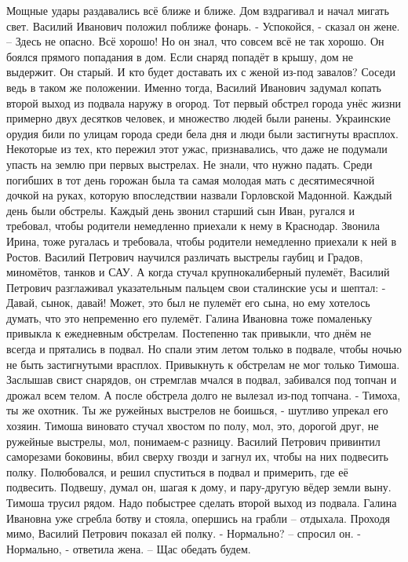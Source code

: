 Мощные удары раздавались всё ближе и ближе. Дом вздрагивал и начал мигать свет. Василий Иванович положил поближе фонарь.
- Успокойся, - сказал он жене. – Здесь не опасно.  Всё хорошо!
Но он знал, что совсем всё не так хорошо. Он боялся прямого попадания в дом. Если снаряд попадёт в крышу, дом не выдержит. Он старый. И кто будет доставать их с женой из-под завалов? Соседи ведь в таком же положении. Именно тогда, Василий Иванович задумал копать второй выход из подвала наружу в огород.
Тот первый обстрел города унёс жизни примерно двух десятков человек, и множество людей были ранены. Украинские орудия били по улицам города среди бела дня и люди были застигнуты врасплох. Некоторые из тех, кто пережил этот ужас, признавались, что даже не подумали упасть на землю при первых выстрелах. Не знали, что нужно падать. Среди погибших в тот день горожан была та самая молодая мать с десятимесячной дочкой на руках, которую впоследствии назвали Горловской Мадонной.
Каждый день были обстрелы. Каждый день звонил старший сын Иван, ругался и требовал, чтобы родители немедленно приехали к нему в Краснодар. Звонила Ирина, тоже ругалась и требовала, чтобы родители немедленно приехали к ней в Ростов. Василий Петрович научился различать выстрелы гаубиц и Градов, миномётов, танков  и САУ. А когда стучал крупнокалиберный пулемёт, Василий Петрович разглаживал указательным пальцем свои сталинские усы и шептал: - Давай, сынок, давай! Может, это был не пулемёт его сына, но ему хотелось думать, что это непременно его пулемёт.
Галина Ивановна тоже помаленьку привыкла к ежедневным обстрелам. Постепенно так привыкли, что днём не всегда и прятались в подвал. Но спали этим летом только в подвале, чтобы ночью не быть застигнутыми врасплох. Привыкнуть к обстрелам не мог только Тимоша. Заслышав свист снарядов, он стремглав мчался в подвал, забивался под топчан и дрожал всем телом. А после обстрела долго не вылезал из-под топчана.
- Тимоха, ты же охотник. Ты же ружейных выстрелов не боишься, - шутливо упрекал его хозяин. Тимоша виновато стучал хвостом по полу, мол, это, дорогой друг, не ружейные выстрелы, мол, понимаем-с разницу.
Василий Петрович привинтил саморезами боковины, вбил сверху гвозди и загнул их, чтобы на них подвесить полку. Полюбовался, и решил спуститься в подвал и примерить, где её подвесить. Подвешу, думал он, шагая к дому, и пару-другую вёдер земли выну. Тимоша трусил рядом. Надо побыстрее сделать второй выход из подвала. Галина Ивановна уже сгребла ботву и стояла, опершись на грабли – отдыхала. Проходя мимо, Василий Петрович показал ей полку.
- Нормально? – спросил он.
- Нормально, - ответила жена. – Щас обедать будем.
